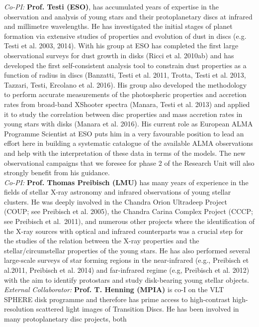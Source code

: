 \documentclass[12pt]{article}
\begin{document}
{\it Co-PI:} {\bf Prof. Testi (ESO)}, has accumulated years of expertise
in the observation and analysis of young stars and their protoplanetary
discs at infrared and millimetre wavelengths. He has investigated the initial stages of planet formation via
extensive studies of properties and evolution of dust in discs (e.g. Testi et
al. 2003, 2014). With his group at ESO has completed the first large observational surveys for dust growth
in disks (Ricci et al. 2010ab) and has developed the first self-consistent analysis tool to constrain dust properties
as a function of radius in discs (Banzatti, Testi et al. 2011, Trotta,
Testi et al. 2013, Tazzari, Testi, Ercolano et al. 2016). His group also developed the methodology to perform accurate measurements of the photospheric properties and accretion rates from broad-band XShooter spectra (Manara, Testi et al. 2013) and applied it to study the correlation between disc properties and mass accretion rates in young stars with disks (Manara et al. 2016).
His current role as European ALMA Programme Scientist at ESO
puts him in a very favourable position to lead an effort here in
building a systematic catalogue of the available ALMA observations and help with the interpretation of these data in terms of
the models. The new observational
campaigns that we foresee for phase 2 of the Research Unit will also
strongly 
benefit from his guidance. \\
{\it Co-PI:} {\bf Prof. Thomas Preibisch (LMU)}  has many years of experience in the
fields of stellar X-ray astronomy and infrared observations
of young stellar clusters.
He was deeply involved in the
Chandra Orion Ultradeep Project (COUP;  see Preibisch et al. 2005),
the Chandra Carina Complex Project (CCCP; see Preibisch et al.~2011),
and numerous other projects where
the identification of the X-ray sources with optical
and infrared counterparts was a crucial step for the studies
of the relation between the X-ray properties and the stellar/circumstellar
properties of the young stars. He has also performed several large-scale surveys of star forming
regions in the near-infrared (e.g., Preibisch et al.2011,
Preibisch et al. 2014)
and far-infrared regime (e.g, Preibisch et al. 2012)
with the aim to identify protostars and study disk-bearing young
stellar objects.\\
{\it External Collaborator: } {\bf Prof. T. Henning (MPIA)}  is co-I
on the VLT SPHERE disk programme and therefore has prime access to
high-contrast high-resolution scattered light images of Transition
Discs. He has been involved in many protoplanetary disc projects, both
\end{document}
